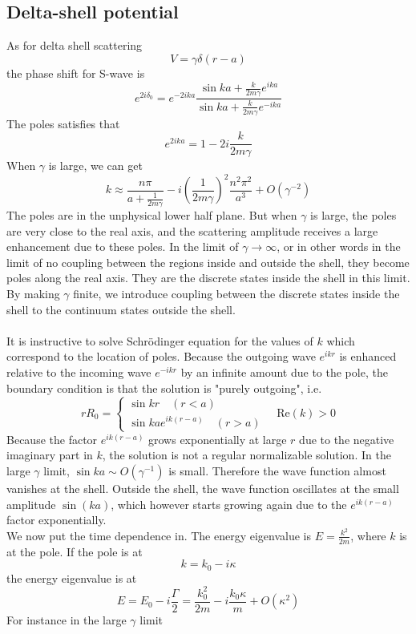 \subsection{Delta-shell potential}
As for delta shell scattering
\[V = \gamma\delta(r-a)\]
the phase shift for S-wave is
\[e^{2i\delta_0} = e^{-2ika}\frac{\sin ka + \frac{k}{2m\gamma}e^{ika}}{\sin ka + \frac{k}{2m\gamma}e^{-ika}}\]
The poles satisfies that
\[e^{2ika} = 1 - 2i\frac{k}{2m\gamma}\]
When $\gamma$ is large, we can get
\[k \approx \frac{n\pi}{a + \frac{1}{2m\gamma}} -i \left(\frac{1}{2m\gamma} \right)^2 \frac{n^2\pi^2}{a^3} + O(\gamma^{-2})\]
The poles are in the unphysical lower half plane. But when $\gamma$ is large, the poles are very close to the real axis, and the scattering amplitude receives a large enhancement due to these poles. 
In the limit of $\gamma \to \infty$, or in other words in the limit of no coupling between the regions inside and outside the shell, they become poles along the real axis. 
They are the discrete states inside the shell in this limit. 
By making $\gamma$ finite, we introduce coupling between the discrete states inside the shell to the continuum states outside the shell.
\\ \\
It is instructive to solve Schrödinger equation for the values of $k$ which correspond to the location of poles. Because the outgoing wave $e^{ikr}$ is enhanced relative to the incoming wave $e^{-ikr}$ by an infinite amount due to the pole, the boundary condition is that the solution is "purely outgoing", i.e.
\[rR_0 = \begin{cases} \sin kr \quad (r<a) \\ \sin ka e^{ik(r-a)} \quad (r>a)  \end{cases} \quad \mathrm{Re}(k) > 0\]
Because the factor $e^{ik(r-a)}$ grows exponentially at large $r$ due to the negative imaginary part in $k$, the solution is not a regular normalizable solution.
In the large $\gamma$ limit, $\sin ka \sim O(\gamma^{-1})$ is small. Therefore the wave function almost vanishes at the shell.
Outside the shell, the wave function oscillates at the small amplitude $\sin(ka)$, which however starts growing again due to the $e^{ik(r-a)}$ factor exponentially.
\\
We now put the time dependence in. The energy eigenvalue
is $E = \frac{k^2}{2m}$, where $k$ is at the pole. If the pole is at
\[k = k_0 - i\kappa\]
the energy eigenvalue is at
\[E = E_0 - i\frac{\Gamma}{2} = \frac{k_0^2}{2m} - i \frac{k_0\kappa}{m} + O(\kappa^2)\]
For instance in the large $\gamma$ limit
